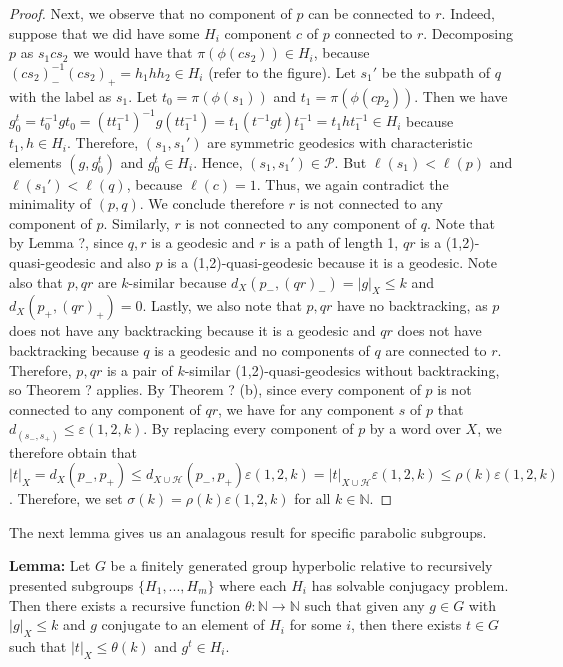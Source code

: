 \documentclass[12pt]{article}
\newcommand{\vs}{\vskip10pt}
\begin{document}
\begin{proof}
		\vs 
		
		Next, we observe that no component of $p$ can be connected to $r$. Indeed, suppose that we did have some $H_i$ component $c$ of $p$ connected to $r$. Decomposing $p$ as $s_1 c s_2$ we would have that $\pi(\phi(c s_2)) \in H_i$, because $(c s_2)_{-}^{-1}(c s_2)_{+} = h_1 h h_2 \in H_i$ (refer to the figure). Let $s_1'$ be the subpath of $q$ with the label as $s_1$. Let $t_0 = \pi(\phi(s_1))$ and $t_1 = \pi(\phi(c p_2))$. Then we have $g^t_0 = t_0^{-1} g t_0 = (t t_1^{-1})^{-1} g (t t_1^{-1})= t_1  (t^{-1} g t) t_1^{-1} = t_1 h t_1^{-1} \in H_i$ because $t_1, h \in H_i$. Therefore, $(s_1,s_1')$ are symmetric geodesics with characteristic elements $(g, g^t_0)$ and $g^t_0 \in H_i$. Hence, $(s_1, s_1') \in \mathcal{P}$. But $\ell(s_1) < \ell(p)$ and $\ell(s_1') < \ell(q)$, because $\ell(c) = 1$. Thus, we again contradict the minimality of $(p,q)$. We conclude therefore $r$ is not connected to any component of $p$. Similarly, $r$ is not connected to any component of $q$. Note that by Lemma ?, since $q,r$ is a geodesic and $r$ is a path of length 1, $qr$ is a (1,2)-quasi-geodesic and also $p$ is a (1,2)-quasi-geodesic because it is a geodesic. Note also that $p, qr$ are $k$-similar because $d_X(p_{-}, (qr)_{-}) = \vert g \vert_X \leq k$ and $d_X(p_{+}, (qr)_{+}) = 0$. Lastly, we also note that $p,qr$ have no backtracking, as $p$ does not have any backtracking because it is a geodesic and $qr$ does not have backtracking because $q$ is a geodesic and no components of $q$ are connected to $r$. Therefore, $p, qr$ is a pair of $k$-similar (1,2)-quasi-geodesics without backtracking, so Theorem ? applies. By Theorem ? (b), since every component of $p$ is not connected to any component of $qr$, we have for any component $s$ of $p$ that $d_(s_{-}, s_{+}) \leq \varepsilon(1,2,k)$. By replacing every component of $p$ by a word over $X$, we therefore obtain that $\vert t \vert_X = d_X(p_{-}, p_{+}) \leq d_{X \cup \mathcal{H}}(p_{-}, p_{+}) \varepsilon(1,2,k) = \vert t \vert_{X \cup \mathcal{H}} \varepsilon(1,2,k) \leq \rho(k) \varepsilon(1,2,k)$. Therefore, we set $\sigma(k) = \rho(k) \varepsilon(1,2,k)$ for all $k \in \mathbb{N}$.
		
	\end{proof}

	The next lemma gives us an analagous result for specific parabolic subgroups. 
	
	\vs 
	
	\textbf{Lemma: } Let $G$ be a finitely generated group hyperbolic relative to recursively presented subgroups $\{H_1,...,H_m\}$ where each $H_i$ has solvable conjugacy problem. Then there exists a recursive function $\theta: \mathbb{N} \rightarrow \mathbb{N}$ such that given any $g \in G$ with $\vert g \vert_X \leq k$ and $g$ conjugate to an element of $H_i$ for some $i$, then there exists $t \in G$ such that $\vert t \vert_X \leq \theta(k)$ and $g^t \in H_i$. 
	
\end{document}
